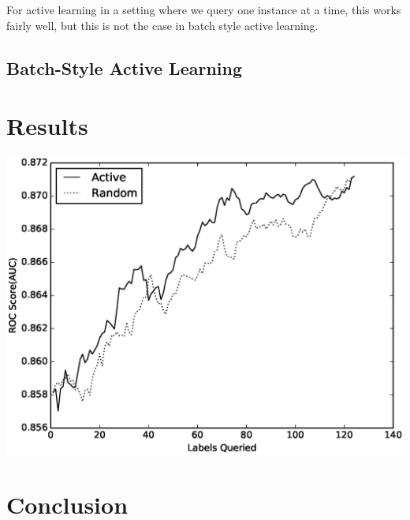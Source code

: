 \documentclass{article}
\begin{document}
For active learning in a setting where we query one instance at a time, this works fairly well, but this is not the case in batch style active learning. 

\subsection*{Batch-Style Active Learning}



  






\cite{active_learning}
\section*{Results}
\includegraphics[scale=0.5]{plot}
\section*{Conclusion}


{}
\end{document}
